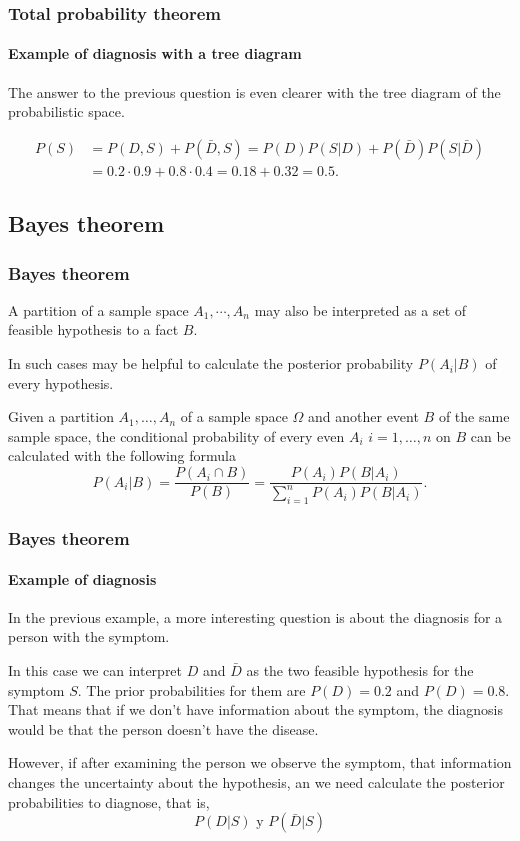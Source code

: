 \begin{frame}
\frametitle{Total probability theorem}
\framesubtitle{Example of diagnosis with a tree diagram}
The answer to the previous question is even clearer with the tree diagram of the probabilistic space.

\begin{center}
\resizebox{0.8\textwidth}{!}{}
\end{center}

\begin{align*}
P(S) &= P(D,S) + P(\bar D,S) = P(D)P(S|D)+P(\bar D)P(S|\bar D)\\
& = 0.2\cdot 0.9+ 0.8\cdot 0.4 = 0.18 + 0.32 = 0.5.
\end{align*}
\end{frame}


\subsection{Bayes theorem}

\begin{frame}
\frametitle{Bayes theorem}
A partition of a sample space $A_1,\cdots,A_n$ may also be interpreted as a set of feasible hypothesis to a fact
$B$.

In such cases may be helpful to calculate the posterior probability $P(A_i|B)$ of every hypothesis.

\begin{theorem}[Bayes]
Given a partition $A_1,\ldots,A_n$ of a sample space $\Omega$ and another event $B$ of the same sample space, the
conditional probability of every even $A_i$ $i=1,\ldots,n$ on $B$ can be calculated with the following formula
\[
P(A_i|B) = \frac{P(A_i\cap B)}{P(B)} = \frac{P(A_i)P(B|A_i)}{\sum_{i=1}^n P(A_i)P(B|A_i)}.
\]
\end{theorem}
\end{frame}


\begin{frame}
\frametitle{Bayes theorem}
\framesubtitle{Example of diagnosis}
In the previous example, a more interesting question is about the diagnosis for a person with the symptom.  

In this case we can interpret $D$ and $\bar D$ as the two feasible hypothesis for the symptom $S$.
The prior probabilities for them are $P(D)=0.2$ and $P(D)=0.8$.
That means that if we don't have information about the symptom, the diagnosis would be that the person doesn't have the
disease.

However, if after examining the person we observe the symptom, that information changes the uncertainty about the
hypothesis, an we need calculate the posterior probabilities to diagnose, that is,
\[
P(D|S) \mbox{ y } P(\bar D|S)
\]
\end{frame}


